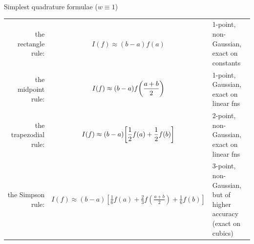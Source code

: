 \documentclass[a4paper]{article}
\begin{document}
\begin{example}
    Simplest quadrature formulae ($w\equiv 1$)
    \begin{center}
        \begin{tabular}{rcl}
            the rectangle rule: & $\displaystyle  I(f) \approx (b-a) f(a) $ & \parbox{3.5cm}{1-point,\\ non-Gaussian,\\ exact on constants}\\[2em] 
            the midpoint rule: & $\displaystyle I(f)\approx (b-a)f\qty(\frac{a+b}{2}) $ & \parbox{3.5cm}{1-point, Gaussian,\\ exact on linear fns}\\[2em] 
            the trapezodial rule: & $\displaystyle I(f) \approx (b-a)\qty[\frac{1}{2}f(a)+\frac{1}{2}f(b)] $ & \parbox{3.5cm}{2-point,\\ non-Gaussian,\\ exact on linear fns}\\[2em] 
            the Simpson rule: & $\displaystyle I(f) \approx(b-a)\left[\frac{1}{6} f(a)+\frac{2}{3} f\left(\frac{a+b}{2}\right)+\frac{1}{6} f(b)\right]$ & \parbox{3.5cm}{3-point,\\ non-Gaussian,\\ but of higher accuracy \\ (exact on cubics)}
        \end{tabular}
    \end{center}
\end{example}
\end{document}
